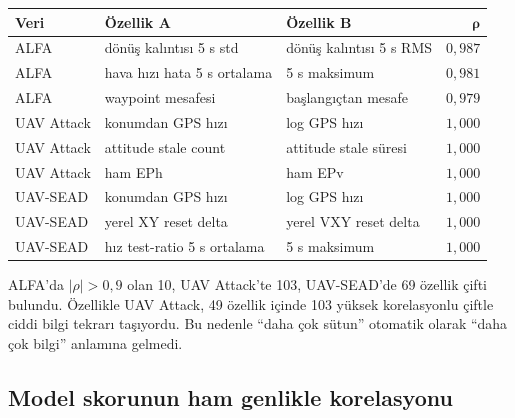 \documentclass[10pt,a4paper]{article}
\begin{document}
\begin{longtable}{p{}p{}p{}r}
\toprule
\textbf{Veri} & \textbf{Özellik A} & \textbf{Özellik B} & $\boldsymbol{\rho}$ \\
\midrule
\endhead
ALFA & dönüş kalıntısı 5 s std & dönüş kalıntısı 5 s RMS & $0{,}987$ \\
ALFA & hava hızı hata 5 s ortalama & 5 s maksimum & $0{,}981$ \\
ALFA & waypoint mesafesi & başlangıçtan mesafe & $0{,}979$ \\
UAV Attack & konumdan GPS hızı & log GPS hızı & $1{,}000$ \\
UAV Attack & attitude stale count & attitude stale süresi & $1{,}000$ \\
UAV Attack & ham EPh & ham EPv & $1{,}000$ \\
UAV-SEAD & konumdan GPS hızı & log GPS hızı & $1{,}000$ \\
UAV-SEAD & yerel XY reset delta & yerel VXY reset delta & $1{,}000$ \\
UAV-SEAD & hız test-ratio 5 s ortalama & 5 s maksimum & $1{,}000$ \\
\bottomrule
\end{longtable}

\begin{lessonbox}
ALFA'da $|\rho|>0{,}9$ olan 10, UAV Attack'te 103, UAV-SEAD'de 69 özellik
çifti bulundu. Özellikle UAV Attack, 49 özellik içinde 103 yüksek korelasyonlu
çiftle ciddi bilgi tekrarı taşıyordu. Bu nedenle ``daha çok sütun'' otomatik
olarak ``daha çok bilgi'' anlamına gelmedi.
\end{lessonbox}

\subsection{Model skorunun ham genlikle korelasyonu}
\end{document}
